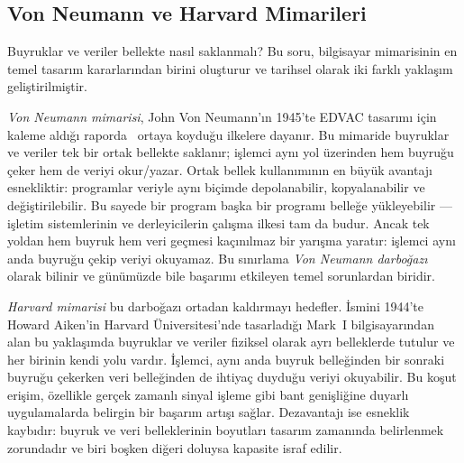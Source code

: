 \subsection{Von Neumann ve Harvard Mimarileri}
\label{subsec:vonneumann-harvard}

Buyruklar ve veriler bellekte nasıl saklanmalı? Bu soru, bilgisayar mimarisinin en temel tasarım kararlarından birini oluşturur ve tarihsel olarak iki farklı yaklaşım geliştirilmiştir.

\emph{Von Neumann mimarisi}, John Von Neumann'ın 1945'te EDVAC tasarımı için kaleme aldığı raporda~\cite{vonneumann1945} ortaya koyduğu ilkelere dayanır. Bu mimaride buyruklar ve veriler tek bir ortak bellekte saklanır; işlemci aynı yol üzerinden hem buyruğu çeker hem de veriyi okur/yazar. Ortak bellek kullanımının en büyük avantajı esnekliktir: programlar veriyle aynı biçimde depolanabilir, kopyalanabilir ve değiştirilebilir. Bu sayede bir program başka bir programı belleğe yükleyebilir --- işletim sistemlerinin ve derleyicilerin çalışma ilkesi tam da budur. Ancak tek yoldan hem buyruk hem veri geçmesi kaçınılmaz bir yarışma yaratır: işlemci aynı anda buyruğu çekip veriyi okuyamaz. Bu sınırlama \emph{Von Neumann darboğazı} olarak bilinir ve günümüzde bile başarımı etkileyen temel sorunlardan biridir.

\emph{Harvard mimarisi} bu darboğazı ortadan kaldırmayı hedefler. İsmini 1944'te Howard Aiken'in Harvard Üniversitesi'nde tasarladığı Mark~I bilgisayarından alan bu yaklaşımda buyruklar ve veriler fiziksel olarak ayrı belleklerde tutulur ve her birinin kendi yolu vardır. İşlemci, aynı anda buyruk belleğinden bir sonraki buyruğu çekerken veri belleğinden de ihtiyaç duyduğu veriyi okuyabilir. Bu koşut erişim, özellikle gerçek zamanlı sinyal işleme gibi bant genişliğine duyarlı uygulamalarda belirgin bir başarım artışı sağlar. Dezavantajı ise esneklik kaybıdır: buyruk ve veri belleklerinin boyutları tasarım zamanında belirlenmek zorundadır ve biri boşken diğeri doluysa kapasite israf edilir.

